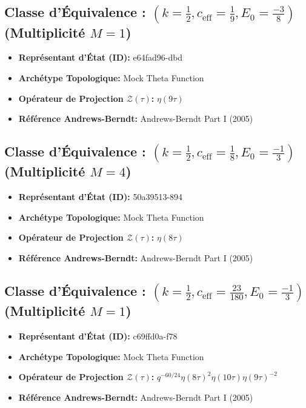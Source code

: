 \documentclass[11pt,twoside,openright]{book}
\begin{document}
\subsection*{Classe d'Équivalence : $(k=\frac{1}{2}, c_{\text{eff}}=\frac{1}{9}, E_0=\frac{-3}{8})$ (Multiplicité $M=1$)}
\begin{itemize}
  \item \textbf{Représentant d'État (ID):} e64fad96-dbd
  \item \textbf{Archétype Topologique:} Mock Theta Function
  \item \textbf{Opérateur de Projection $\mathcal{Z}(\tau)$:} $\eta(9\tau)$
  \item \textbf{Référence Andrews-Berndt:} Andrews-Berndt Part I (2005)
\end{itemize}

\subsection*{Classe d'Équivalence : $(k=\frac{1}{2}, c_{\text{eff}}=\frac{1}{8}, E_0=\frac{-1}{3})$ (Multiplicité $M=4$)}
\begin{itemize}
  \item \textbf{Représentant d'État (ID):} 50a39513-894
  \item \textbf{Archétype Topologique:} Mock Theta Function
  \item \textbf{Opérateur de Projection $\mathcal{Z}(\tau)$:} $\eta(8\tau)$
  \item \textbf{Référence Andrews-Berndt:} Andrews-Berndt Part I (2005)
\end{itemize}

\subsection*{Classe d'Équivalence : $(k=\frac{1}{2}, c_{\text{eff}}=\frac{23}{180}, E_0=\frac{-1}{3})$ (Multiplicité $M=1$)}
\begin{itemize}
  \item \textbf{Représentant d'État (ID):} c69ffd0a-f78
  \item \textbf{Archétype Topologique:} Mock Theta Function
  \item \textbf{Opérateur de Projection $\mathcal{Z}(\tau)$:} $q^{-60/24} \eta(8\tau)^{2} \eta(10\tau) \eta(9\tau)^{-2}$
  \item \textbf{Référence Andrews-Berndt:} Andrews-Berndt Part I (2005)
\end{itemize}
\end{document}
